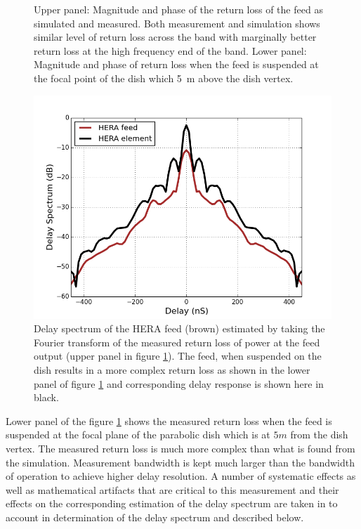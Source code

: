 \documentclass[twocolumn]{emulateapj}
\begin{document}
\begin{figure}[ht]
\begin{minipage}[b]{0.5\linewidth}
\end{minipage}
\caption{Upper panel: Magnitude and phase of the return loss of the feed as simulated and measured. Both measurement and simulation shows similar level of return loss across the band with marginally better return loss at the high frequency end of the band. Lower panel: Magnitude and phase of return loss when the feed is suspended at the focal point of the dish which 5~m above the dish vertex.}   
\label{RL_mag_dish}
\end{figure}

\begin{figure}       
\centering
\includegraphics[width=\linewidth]{GB_reflectometry_part3/plot/ds_feed_dish.png}
\caption{Delay spectrum of the HERA feed (brown) estimated by taking the Fourier transform of the measured return loss of power at the feed output (upper panel in figure \ref{RL_mag_dish}). The feed, when suspended on the dish results in a more complex return loss as shown in the lower panel of figure \ref{RL_mag_dish} and corresponding delay response is shown here in black. }
\label{ds_feed_on_dish_trans}
\end{figure}

Lower panel of the figure \ref{RL_mag_dish} shows the measured return loss when the feed is suspended at the focal plane of the parabolic dish which is at $5m$ from the dish vertex. The measured return loss is much more complex than what is found from the simulation. %
Measurement bandwidth is kept much larger than the bandwidth of operation to achieve higher delay resolution. A number of systematic effects as well as mathematical artifacts that are critical to this measurement and their effects on the corresponding estimation of the delay spectrum are taken in to account in determination of the delay spectrum and described below. 
\end{document}
